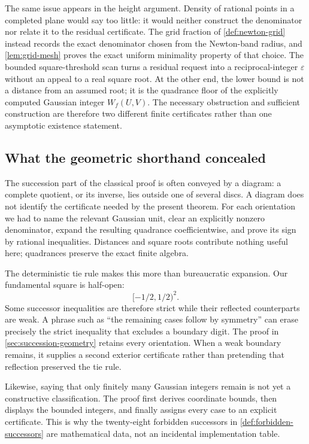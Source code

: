 \documentclass[11pt]{article}
\newcommand{\eps}{\varepsilon}
\begin{document}
The same issue appears in the height argument.  Density of rational points
in a completed plane would say too little: it would neither construct the
denominator nor relate it to the residual certificate.  The grid fraction of
\cref{def:newton-grid} instead records the exact denominator chosen from the
Newton-band radius, and \cref{lem:grid-mesh} proves the exact uniform
minimality property of that choice.  The bounded square-threshold scan turns
a residual request into a reciprocal-integer $\eps$ without an appeal to a
real square root.  At the other end, the lower bound is not a distance from
an assumed root; it is the quadrance floor of the explicitly computed
Gaussian integer $W_f(U,V)$.  The necessary obstruction and sufficient
construction are therefore two different finite certificates rather than one
asymptotic existence statement.

\subsection{What the geometric shorthand concealed}

The succession part of the classical proof is often conveyed by a diagram:
a complete quotient, or its inverse, lies outside one of several discs.  A
diagram does not identify the certificate needed by the present theorem.
For each orientation we had to name the relevant Gaussian unit, clear an
explicitly nonzero denominator, expand the resulting quadrance
coefficientwise, and prove its sign by rational inequalities.  Distances and
square roots contribute nothing useful here; quadrances preserve the exact
finite algebra.

The deterministic tie rule makes this more than bureaucratic expansion.  Our
fundamental square is half-open:
\[
                         [-1/2,1/2)^2.
\]
Some successor inequalities are therefore strict while their reflected
counterparts are weak.  A phrase such as ``the remaining cases follow by
symmetry'' can erase precisely the strict inequality that excludes a
boundary digit.  The proof in \cref{sec:succession-geometry} retains every
orientation.  When a weak boundary remains, it supplies a second exterior
certificate rather than pretending that reflection preserved the tie rule.

Likewise, saying that only finitely many Gaussian integers remain is not yet
a constructive classification.  The proof first derives coordinate bounds,
then displays the bounded integers, and finally assigns every case to an
explicit certificate.  This is why the twenty-eight forbidden successors in
\cref{def:forbidden-successors} are mathematical data, not an incidental
implementation table.
\end{document}
